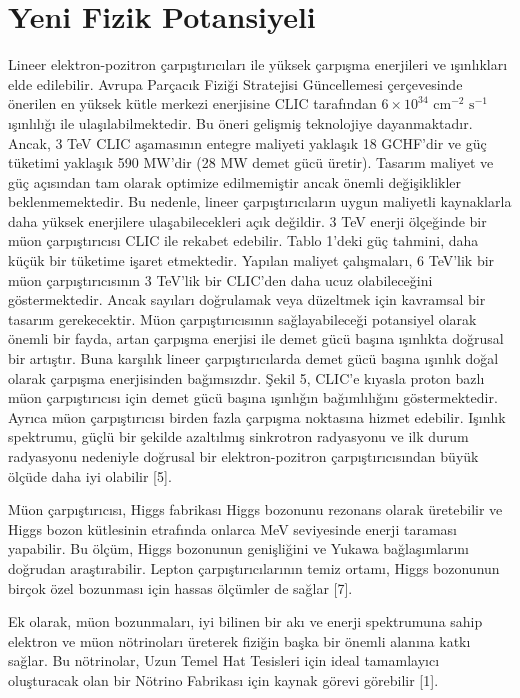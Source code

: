 \documentclass{article}
\begin{document}
	
\section{Yeni Fizik Potansiyeli}	

Lineer elektron-pozitron çarpıştırıcıları ile yüksek çarpışma enerjileri ve ışınlıkları elde edilebilir. Avrupa Parçacık Fiziği Stratejisi Güncellemesi çerçevesinde önerilen en yüksek kütle merkezi enerjisine CLIC tarafından $6 \times 10^{34} \textrm{ cm}^{-2} \textrm{ s}^{-1}$ ışınlılığı ile ulaşılabilmektedir. Bu öneri gelişmiş teknolojiye dayanmaktadır. Ancak, 3 TeV CLIC aşamasının entegre maliyeti yaklaşık 18 GCHF'dir ve güç tüketimi yaklaşık 590 MW'dir (28 MW demet gücü üretir). Tasarım maliyet ve güç açısından tam olarak optimize edilmemiştir ancak önemli değişiklikler beklenmemektedir. Bu nedenle, lineer çarpıştırıcıların uygun maliyetli kaynaklarla daha yüksek enerjilere ulaşabilecekleri açık değildir. 3 TeV enerji ölçeğinde bir müon çarpıştırıcısı CLIC ile rekabet edebilir. Tablo 1'deki güç tahmini, daha küçük bir tüketime işaret etmektedir. Yapılan maliyet çalışmaları, 6 TeV'lik bir müon çarpıştırıcısının 3 TeV'lik bir CLIC'den daha ucuz olabileceğini göstermektedir. Ancak sayıları doğrulamak veya düzeltmek için kavramsal bir tasarım gerekecektir. Müon çarpıştırıcısının sağlayabileceği potansiyel olarak önemli bir fayda, artan çarpışma enerjisi ile demet gücü başına ışınlıkta doğrusal bir artıştır. Buna karşılık lineer çarpıştırıcılarda demet gücü başına ışınlık doğal olarak çarpışma enerjisinden bağımsızdır. Şekil 5, CLIC'e kıyasla proton bazlı müon çarpıştırıcısı için demet gücü başına ışınlığın bağımlılığını göstermektedir.  Ayrıca müon çarpıştırıcısı birden fazla çarpışma noktasına hizmet edebilir. Işınlık spektrumu, güçlü bir şekilde azaltılmış sinkrotron radyasyonu ve ilk durum radyasyonu nedeniyle doğrusal bir elektron-pozitron çarpıştırıcısından büyük ölçüde daha iyi olabilir [5].

Müon çarpıştırıcısı, Higgs fabrikası Higgs bozonunu rezonans olarak üretebilir ve Higgs bozon kütlesinin etrafında onlarca MeV seviyesinde enerji taraması yapabilir. Bu ölçüm, Higgs bozonunun genişliğini ve Yukawa bağlaşımlarını doğrudan araştırabilir. Lepton çarpıştırıcılarının temiz ortamı, Higgs bozonunun birçok özel bozunması için hassas ölçümler de sağlar [7].

Ek olarak, müon bozunmaları, iyi bilinen bir akı ve enerji spektrumuna sahip elektron ve müon nötrinoları üreterek fiziğin başka bir önemli alanına katkı sağlar. Bu nötrinolar, Uzun Temel Hat Tesisleri için ideal tamamlayıcı oluşturacak olan bir Nötrino Fabrikası için kaynak görevi görebilir [1]. 
\end{document}
